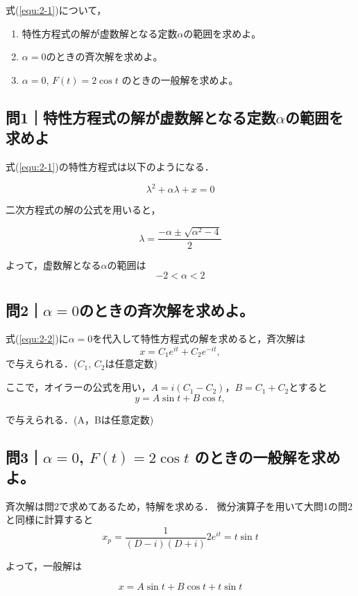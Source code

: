 \documentclass[a4paper,11pt]{bxjsarticle}
\begin{document}
式(\ref{equ:2-1})について，
\begin{enumerate}
  \item 特性方程式の解が虚数解となる定数$\alpha$の範囲を求めよ。
  \item $\alpha=0$のときの斉次解を求めよ。
  \item $\alpha=0$, $F(t)=2\cos 𝑡$ のときの一般解を求めよ。
\end{enumerate}

\subsection{問1｜特性方程式の解が虚数解となる定数$\alpha$の範囲を求めよ}
式(\ref{equ:2-1})の特性方程式は以下のようになる．

\begin{equation}
  \lambda^2 + \alpha \lambda + x = 0
\end{equation}

二次方程式の解の公式を用いると，

\begin{equation}
 \lambda = \frac{-\alpha \pm \sqrt{\alpha^2 - 4}}{2}
 \label{equ:2-2}
\end{equation}

よって，虚数解となる$\alpha$の範囲は
\begin{equation}
  -2 < \alpha < 2
\end{equation}

\subsection{問2｜$\alpha=0$のときの斉次解を求めよ。}
式(\ref{equ:2-2})に$\alpha=0$を代入して特性方程式の解を求めると，斉次解は
\begin{equation}
  x= C_1e^{it}+C_2e^{-it}, 
\end{equation}
で与えられる．($C_1$, $C_2$は任意定数)

ここで，オイラーの公式を用い，$A=i(C_1-C_2)，B=C_1+C_2$とすると
\begin{equation}
  y= A\sin t + B\cos t, 
\end{equation}

で与えられる．(A，Bは任意定数)

\subsection{問3｜$\alpha=0$, $F(t)=2\cos t$ のときの一般解を求めよ。}
斉次解は問2で求めてあるため，特解を求める．
微分演算子を用いて大問1の問2と同様に計算すると
\begin{equation}
  x_p=\frac{1}{(D-i)(D+i)}2e^{it}=t\sin t
\end{equation}

よって，一般解は

\begin{equation}
  x = A\sin t + B\cos t + t\sin t
\end{equation}


 
\end{document}
